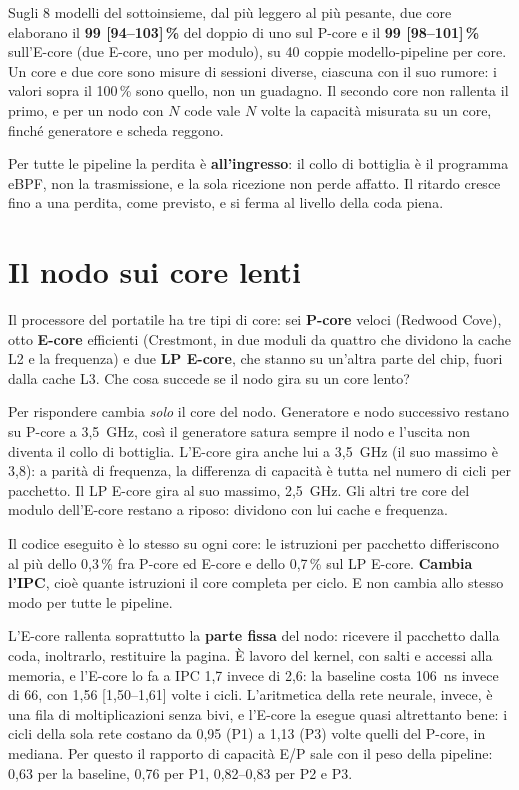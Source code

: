 \documentclass[11pt,a4paper,oneside]{report}
\begin{document}
Sugli 8 modelli del sottoinsieme, dal più leggero al più pesante, due core
elaborano il \textbf{99 [94--103]\,\%} del doppio di uno sul P-core e il
\textbf{99 [98--101]\,\%} sull'E-core (due E-core, uno per modulo), su 40 coppie
modello-pipeline per core. Un core e due core sono misure di sessioni diverse,
ciascuna con il suo rumore: i valori sopra il 100\,\% sono quello, non un
guadagno. Il secondo core non rallenta il primo, e per un nodo con $N$ code vale
$N$ volte la capacità misurata su un core, finché generatore e scheda reggono.

\begin{lezione}
Per tutte le pipeline la perdita è \textbf{all'ingresso}: il collo di bottiglia è il
programma eBPF, non la trasmissione, e la sola ricezione non perde affatto. Il
ritardo cresce fino a una perdita, come previsto, e si ferma al livello della coda
piena.
\end{lezione}

\section{Il nodo sui core lenti}
\label{sec:corelenti}

Il processore del portatile ha tre tipi di core: sei \textbf{P-core} veloci
(Redwood Cove), otto \textbf{E-core} efficienti (Crestmont, in due moduli da
quattro che dividono la cache L2 e la frequenza) e due \textbf{LP E-core}, che
stanno su un'altra parte del chip, fuori dalla cache L3. Che cosa succede se il
nodo gira su un core lento?

Per rispondere cambia \emph{solo} il core del nodo. Generatore e nodo successivo
restano su P-core a 3,5~GHz, così il generatore satura sempre il nodo e l'uscita
non diventa il collo di bottiglia. L'E-core gira anche lui a 3,5~GHz (il suo
massimo è 3,8): a parità di frequenza, la differenza di capacità è tutta nel
numero di cicli per pacchetto. Il LP E-core gira al suo massimo, 2,5~GHz. Gli
altri tre core del modulo dell'E-core restano a riposo: dividono con lui cache e
frequenza.

\begin{lezione}
Il codice eseguito è lo stesso su ogni core: le istruzioni per pacchetto
differiscono al più dello 0,3\,\% fra P-core ed E-core e dello 0,7\,\% sul LP
E-core. \textbf{Cambia l'IPC}, cioè quante istruzioni il core completa per ciclo.
E non cambia allo stesso modo per tutte le pipeline.
\end{lezione}

L'E-core rallenta soprattutto la \textbf{parte fissa} del nodo: ricevere il
pacchetto dalla coda, inoltrarlo, restituire la pagina. È lavoro del kernel, con
salti e accessi alla memoria, e l'E-core lo fa a IPC 1,7 invece di 2,6: la
baseline costa 106~ns invece di 66, con 1,56 [1,50--1,61] volte i cicli.
L'aritmetica della rete neurale, invece, è una fila di moltiplicazioni senza
bivi, e l'E-core la esegue quasi altrettanto bene: i cicli della sola rete
costano da 0,95 (P1) a 1,13 (P3) volte quelli del P-core, in mediana. Per questo
il rapporto di capacità E/P sale con il peso della pipeline: 0,63 per la
baseline, 0,76 per P1, 0,82--0,83 per P2 e P3.
\end{document}
